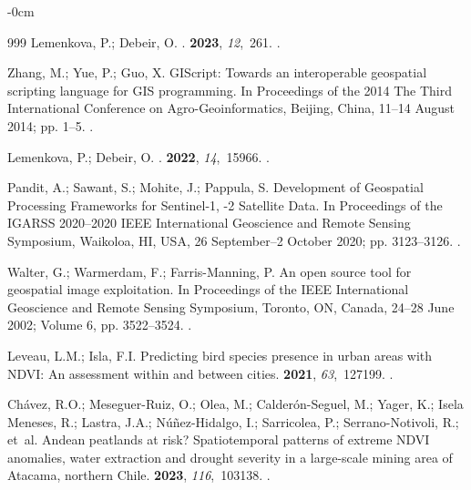 \documentclass[jimaging,article,accept,pdftex,moreauthors]{Definitions/mdpi}
\begin{document}
\begin{adjustwidth}{-\extralength}{0cm}
\begin{thebibliography}{999}
Lemenkova, P.; Debeir, O.
.
 {\bf 2023}, {\em 12},~261.
.

Zhang, M.; Yue, P.; Guo, X.
\newblock GIScript: Towards an interoperable geospatial scripting language for
  GIS programming.
\newblock In Proceedings of the 2014 The Third International Conference on
  Agro-Geoinformatics,  Beijing, China, 11--14 August 2014; pp. 1--5.
.

Lemenkova, P.; Debeir, O.
.
 {\bf 2022}, {\em 14},~15966.
.

Pandit, A.; Sawant, S.; Mohite, J.; Pappula, S.
\newblock Development of Geospatial Processing Frameworks for Sentinel-1, -2
  Satellite Data.
\newblock In Proceedings of the IGARSS 2020--2020 IEEE International
  Geoscience and Remote Sensing Symposium, Waikoloa, HI, USA, 26 September--2 October 2020; pp. 3123--3126.
.

Walter, G.; Warmerdam, F.; Farris-Manning, P.
\newblock An open source tool for geospatial image exploitation.
\newblock In Proceedings of the IEEE International Geoscience and Remote
  Sensing Symposium, Toronto, ON, Canada, 24--28 June 2002; Volume 6, pp. 3522--3524.
.

Leveau, L.M.; Isla, F.I.
\newblock Predicting bird species presence in urban areas with NDVI: An
  assessment within and between cities.
 {\bf 2021}, {\em 63},~127199.
.

Chávez, R.O.; Meseguer-Ruiz, O.; Olea, M.; Calderón-Seguel, M.; Yager, K.;
  {Isela Meneses}, R.; Lastra, J.A.; Núñez-Hidalgo, I.; Sarricolea, P.;
  Serrano-Notivoli, R.;  et~al.
\newblock Andean peatlands at risk? Spatiotemporal patterns of extreme NDVI
  anomalies, water extraction and drought severity in a large-scale mining area
  of Atacama, northern Chile.
 {\bf 2023}, {\em 116},~103138.
.


\end{thebibliography}
\end{adjustwidth}
\end{document}

